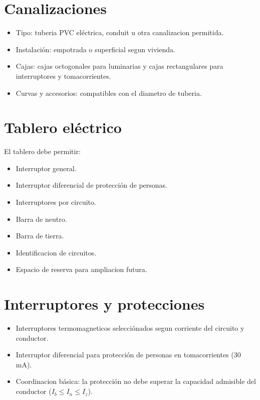 \section{Canalizaciones}

\begin{itemize}
  \item Tipo: tuberia PVC eléctrica, conduit u otra canalizacion permitida.
  \item Instalación: empotrada o superficial segun vivienda.
  \item Cajas: cajas octogonales para luminarias y cajas rectangulares para interruptores y tomacorrientes.
  \item Curvas y accesorios: compatibles con el diametro de tuberia.
\end{itemize}

\section{Tablero eléctrico}

El tablero debe permitir:
\begin{itemize}
  \item Interruptor general.
  \item Interruptor diferencial de protección de personas.
  \item Interruptores por circuito.
  \item Barra de neutro.
  \item Barra de tierra.
  \item Identificacion de circuitos.
  \item Espacio de reserva para ampliacion futura.
\end{itemize}

\section{Interruptores y protecciones}

\begin{itemize}
  \item Interruptores termomagneticos selecciónados segun corriente del circuito y conductor.
  \item Interruptor diferencial para protección de personas en tomacorrientes (30 mA).
  \item Coordinacion básica: la protección no debe superar la capacidad admisible del conductor ($I_b \le I_n \le I_z$).
\end{itemize}

